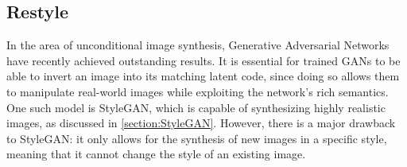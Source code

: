 



\subsection{Restyle}
\label{section:restyle}
In the area of unconditional image synthesis, Generative Adversarial Networks have recently achieved outstanding results. 
It is essential for trained GANs to be able to invert an image into its matching latent code, since doing so allows them to manipulate real-world images while exploiting the network's rich semantics.
One such model is StyleGAN, which is capable of synthesizing highly realistic images, as discussed in \ref{section:StyleGAN}. However, there is a major drawback to StyleGAN: it only allows for the synthesis of new images in a specific style, meaning that it cannot change the style of an existing image.

